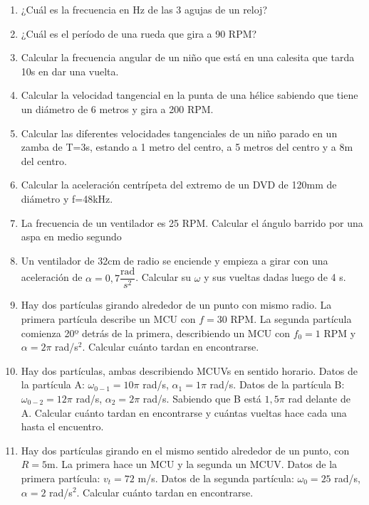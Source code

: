 \begin{enumerate}[label=\arabic*)]

\item ¿Cuál es la frecuencia en Hz de las 3 agujas de un reloj? %

\item ¿Cuál es el período de una rueda que gira a 90 RPM? %

\item Calcular la frecuencia angular de un niño que está en una calesita que tarda 10s en dar una vuelta. %

\item Calcular la velocidad tangencial en la punta de una hélice sabiendo que tiene un diámetro de 6 metros y gira a 200 RPM.

\item Calcular las diferentes velocidades tangenciales de un niño parado en un zamba de T=3s, estando a 1 metro del centro, a 5 metros del centro y a 8m del centro.

\item Calcular la aceleración centrípeta del extremo de un DVD de 120mm de diámetro y f=48kHz.

\item La frecuencia de un ventilador es 25 RPM.
Calcular el ángulo barrido por una aspa en medio segundo

\item Un ventilador de 32cm de radio se enciende y empieza a girar con una aceleración de $\alpha = 0,7 \dfrac{\text{rad}}{s^2}$. Calcular su $\omega$ y sus vueltas dadas luego de 4 s.

\item Hay dos partículas girando alrededor de un punto con mismo radio. La primera partícula describe un MCU con $f = 30$ RPM. La segunda partícula comienza 20º detrás de la primera, describiendo un MCU con $f_0 = 1$ RPM y $\alpha =2\pi$ rad/s$^2$. Calcular cuánto tardan en encontrarse.

\item Hay dos partículas, ambas describiendo MCUVs en sentido horario. Datos de la partícula A: $\omega_{0-1}=10\pi$ rad/s, $\alpha_1=1\pi$ rad/s. Datos de la partícula B: $\omega_{0-2}=12\pi$ rad/s, $\alpha_2=2\pi$ rad/s. Sabiendo que B está $1,5\pi$ rad delante de A. Calcular cuánto tardan en encontrarse y cuántas vueltas hace cada una hasta el encuentro.

\item Hay dos partículas girando en el mismo sentido alrededor de un punto, con $R=5$m. La primera hace un MCU y la segunda un MCUV. Datos de la primera partícula: $v_t=72$ m/s. Datos de la segunda partícula: $\omega_0=25$ rad/s, $\alpha= 2$ rad/s$^2$. Calcular cuánto tardan en encontrarse.


\end{enumerate}
